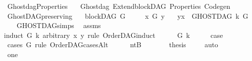%
\begin{isabellebody}%
%
%
\isadelimtheory
%
\endisadelimtheory
%
\isatagtheory
{}\isamarkupfalse%
\ Ghostdag{\isacharunderscore}{\kern0pt}Properties\isanewline
\ \ \ Ghostdag\ Extend{\isacharunderscore}{\kern0pt}blockDAG\ Properties\ Codegen\isanewline
{}%
\endisatagtheory
{\isafoldtheory}%
%
\isadelimtheory
%
\endisadelimtheory
%
\isadelimdocument
%
\endisadelimdocument
%
\isatagdocument
%
\isamarkuptrue%
%
\isamarkuptrue%
%
\endisatagdocument
{\isafolddocument}%
%
\isadelimdocument
%
\endisadelimdocument
{}\isamarkupfalse%
\ GhostDAG{\isacharunderscore}{\kern0pt}preserving{\isacharcolon}{\kern0pt}\isanewline
\ \ \ {\isachardoublequoteopen}blockDAG\ G{\isachardoublequoteclose}\isanewline
\ \ \ \ \ {\isachardoublequoteopen}x\ {\isasymrightarrow}\isactrlsup {\isacharplus}{\kern0pt}\isactrlbsub G\isactrlesub \ y{\isachardoublequoteclose}\isanewline
\ \ \ {\isachardoublequoteopen}{\isacharparenleft}{\kern0pt}y{\isacharcomma}{\kern0pt}x{\isacharparenright}{\kern0pt}\ {\isasymin}\ GHOSTDAG\ k\ G{\isachardoublequoteclose}\isanewline
%
\isadelimproof
\ \ %
\endisadelimproof
%
\isatagproof
{}\isamarkupfalse%
\ GHOSTDAG{\isachardot}{\kern0pt}simps\ \isamarkupfalse%
\ assms\ \isanewline
{}\isamarkupfalse%
{\isacharparenleft}{\kern0pt}induct\ G\ k\ arbitrary{\isacharcolon}{\kern0pt}\ x\ y\ rule{\isacharcolon}{\kern0pt}\ OrderDAG{\isachardot}{\kern0pt}induct\ {\isacharparenright}{\kern0pt}\isanewline
\ \ \isamarkupfalse%
\ {\isacharparenleft}{\kern0pt}{}\ G\ k{\isacharparenright}{\kern0pt}\isanewline
\ \ \isamarkupfalse%
\ \isamarkupfalse%
\ {\isacharquery}{\kern0pt}case\ \isamarkupfalse%
\ {\isacharparenleft}{\kern0pt}cases\ G\ rule{\isacharcolon}{\kern0pt}\ OrderDAG{\isacharunderscore}{\kern0pt}casesAlt{\isacharparenright}{\kern0pt}\isanewline
\ \ \ \ \isamarkupfalse%
\ ntB\isanewline
\ \ \ \ \isamarkupfalse%
\ \isamarkupfalse%
\ {\isacharquery}{\kern0pt}thesis\ \isamarkupfalse%
\ {}\ \isamarkupfalse%
\ auto\isanewline
\ \ \isamarkupfalse%
\isanewline
\ \ \ \ \isamarkupfalse%
\ one\isanewline

\end{isabellebody}
